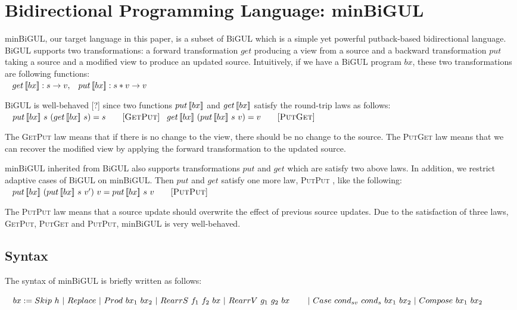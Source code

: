 \section{Bidirectional Programming Language: minBiGUL}

minBiGUL, our target language in this paper, is a subset of BiGUL which is a simple yet powerful putback-based bidirectional language. BiGUL supports two transformations: a forward transformation $get$ producing a view from a source and a backward transformation $put$ taking a source and a modified view to produce an updated source. Intuitively, if we have a BiGUL program $bx$, these two transformations are following functions:\\
    $\hspace*{3mm} get \, [\![bx]\!] : s \to v,
    \hspace*{3mm} put \, [\![bx]\!] : s * v \to v$

BiGUL is well-behaved [?] since two functions $put \, [\![bx]\!]$ and $get \, [\![bx]\!]$ satisfy the round-trip laws as follows:\\
    $\tab \putbx{bx}{s}{(\getbx{bx}{s})} = s \qquad [\textsc{GetPut}]\\
    \tab \getbx{bx}{(\putbx{bx}{s}{v})} = v \qquad [\textsc{PutGet}]$

The \textsc{GetPut} \cite{putget} law means that if there is no change to the view, there should be no change to the source. The \textsc{PutGet} \cite{putget} law means that we can recover the modified view by applying the forward transformation to the updated source.

minBiGUL inherited from BiGUL also supports transformations $put$ and $get$ which are satisfy two above laws. In addition, we restrict adaptive cases of BiGUL on minBiGUL. Then $put$ and $get$ satisfy one more law, \textsc{PutPut} \cite{putput}, like the following:\\
    $\hspace*{3mm} put \, [\![bx]\!] \ (put \, [\![bx]\!] \ s \ v') \ v = put \, [\![bx]\!] \ s \ v \qquad [\textsc{PutPut}]$

The \textsc{PutPut} law means that a source update should overwrite the effect of previous source updates. Due to the satisfaction of three laws, \textsc{GetPut}, \textsc{PutGet} and \textsc{PutPut}, minBiGUL is very well-behaved.

\subsection{Syntax}

The syntax of minBiGUL is briefly written as follows:

$\hspace*{3mm} bx := Skip \ h \
        | \ Replace \
        | \ Prod \ bx_1 \ bx_2 \
        | \ RearrS \ f_1 \ f_2 \ bx \
        | \ RearrV \ g_1 \ g_2 \ bx \\
    \hspace*{3mm} \ \quad | \ Case \ cond_{sv} \ cond_{s} \ bx_1 \ bx_2 \
        | \ Compose \ bx_1 \ bx_2$

